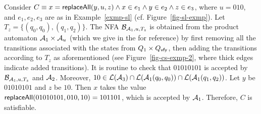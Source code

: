 \begin{example}\label{exmp-cs-case}
Consider $C \equiv x = \mathsf{replaceAll}(y, u, z) \wedge x \in e_1 \wedge y \in e_2 \wedge z \in e_3$, where $u = 010$, and $e_1,e_2,e_3$ are as in Example~\ref{exmp-sl} (cf. Figure~\ref{fig-sl-exmp}).
Let $T_z = \{(q_0,q_0),(q_1,q_2)\}$. The NFA $\mathcal{B}_{\mathcal{A}_1, u, T_z}$ is obtained
    from the product automaton $\mathcal{A}_1 \times \mathcal{A}_u$ (which we give in the
     for reference) by first removing all the transitions  associated with the states from $Q_1 \times Q_{\mathsf{vfy}}$, then adding the transitions according to $T_z$ as aforementioned (see Figure~\ref{fig-cs-exmp-2}, where thick edges indicate added transitions).  It is routine to check that $01010101$ is accepted by $\mathcal{B}_{\mathcal{A}_1, u, T_z}$ and $\mathcal{A}_2$. Moreover, $10 \in \mathcal{L}(\mathcal{A}_3) \cap \mathcal{L}(\mathcal{A}_1(q_0,q_0)) \cap \mathcal{L}(\mathcal{A}_1(q_1,q_2))$. Let $y$ be $01010101$ and $z$ be $10$. Then $x$ takes the value $\mathsf{replaceAll}(01010101, 010, 10)=101101$, which is accepted by $\mathcal{A}_1$. Therefore, $C$ is satisfiable.
%
\begin{figure}[htbp]
\begin{center}

\end{center}
\end{figure}
\end{example}
